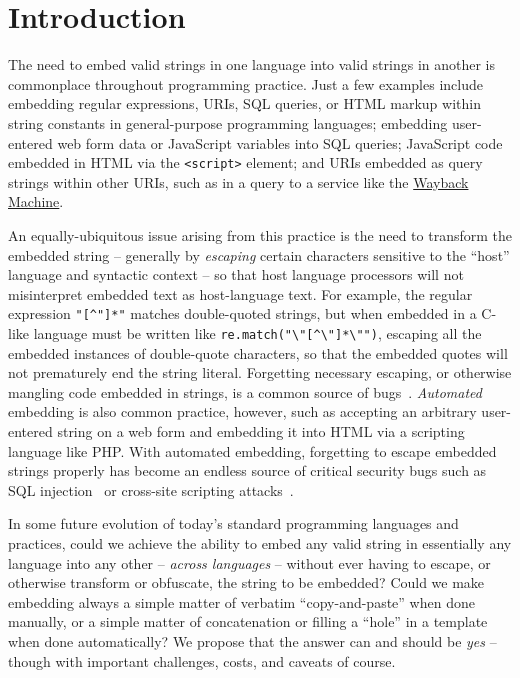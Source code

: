 \section{Introduction}
\label{sec:intro}

The need to embed valid strings in one language into valid strings in another
is commonplace throughout programming practice.
Just a few examples include embedding
regular expressions, URIs, SQL queries, or HTML markup
within string constants in general-purpose programming languages;
embedding user-entered web form data or JavaScript variables into SQL queries;
JavaScript code embedded in HTML via the \verb|<script>| element;
and URIs embedded as query strings within other URIs,
such as in a query to a service like the
\href{https://archive.org/web/}{Wayback Machine}.

An equally-ubiquitous issue arising from this practice
is the need to transform the embedded string --
generally by \emph{escaping} certain characters sensitive
to the ``host'' language and syntactic context --
so that host language processors will not misinterpret embedded text
as host-language text.
For example,
the regular expression \verb|"[^"]*"| matches double-quoted strings,
but when embedded in a C-like language must be written
like \verb|re.match("\"[^\"]*\"")|,
escaping all the embedded instances of double-quote characters,
so that the embedded quotes will not prematurely end the string literal.
Forgetting necessary escaping,
or otherwise mangling code embedded in strings,
is a common source of bugs~\cite{eghbali20strings}.
\emph{Automated} embedding is also common practice, however,
such as accepting an arbitrary user-entered string on a web form
and embedding it into HTML via a scripting language like PHP.
With automated embedding,
forgetting to escape embedded strings properly
has become an endless source of critical security bugs
such as SQL injection~\cite{clarke12sql}
or cross-site scripting attacks~\cite{fogie07xss}.

In some future evolution
of today's standard programming languages and practices,
could we achieve the ability to embed any valid string
in essentially any language into any other --
\emph{across languages} --
without ever having to escape, or otherwise transform or obfuscate,
the string to be embedded?
Could we make embedding always a simple matter of verbatim ``copy-and-paste''
when done manually,
or a simple matter of concatenation
or filling a ``hole'' in a template
when done automatically?
We propose that the answer can and should be \emph{yes} --
though with important challenges, costs, and caveats of course.

